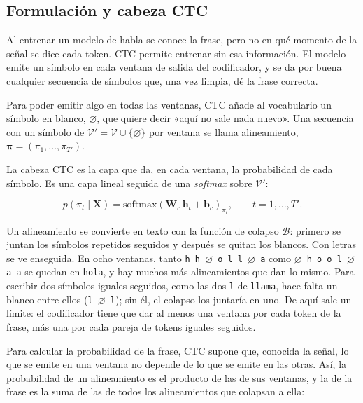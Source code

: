 \subsection{Formulación y cabeza CTC}

Al entrenar un modelo de habla se conoce la frase, pero no en qué momento de la señal se dice cada token. CTC \cite{graves2006ctc} permite entrenar sin esa información. El modelo emite un símbolo en cada ventana de salida del codificador, y se da por buena cualquier secuencia de símbolos que, una vez limpia, dé la frase correcta.

Para poder emitir algo en todas las ventanas, CTC añade al vocabulario un símbolo en blanco, $\varnothing$, que quiere decir «aquí no sale nada nuevo». Una secuencia con un símbolo de $\mathcal{V}' = \mathcal{V} \cup \{\varnothing\}$ por ventana se llama alineamiento, $\boldsymbol{\pi} = (\pi_1, \dots, \pi_{T'})$.

La cabeza CTC es la capa que da, en cada ventana, la probabilidad de cada símbolo. Es una capa lineal seguida de una \textit{softmax} sobre $\mathcal{V}'$:

\begin{equation}
  p(\pi_t \mid \mathbf{X}) = \mathrm{softmax}\left( \mathbf{W}_c\,\mathbf{h}_t + \mathbf{b}_c \right)_{\pi_t}, \qquad t = 1, \dots, T'.
  \label{eq:cabeza-ctc}
\end{equation}

Un alineamiento se convierte en texto con la función de colapso $\mathcal{B}$: primero se juntan los símbolos repetidos seguidos y después se quitan los blancos. Con letras se ve enseguida. En ocho ventanas, tanto \texttt{h h $\varnothing$ o l l $\varnothing$ a} como \texttt{$\varnothing$ h o o l $\varnothing$ a a} se quedan en \texttt{hola}, y hay muchos más alineamientos que dan lo mismo. Para escribir dos símbolos iguales seguidos, como las dos \texttt{l} de \texttt{llama}, hace falta un blanco entre ellos (\texttt{l $\varnothing$ l}); sin él, el colapso los juntaría en uno. De aquí sale un límite: el codificador tiene que dar al menos una ventana por cada token de la frase, más una por cada pareja de tokens iguales seguidos.

Para calcular la probabilidad de la frase, CTC supone que, conocida la señal, lo que se emite en una ventana no depende de lo que se emite en las otras. Así, la probabilidad de un alineamiento es el producto de las de sus ventanas, y la de la frase es la suma de las de todos los alineamientos que colapsan a ella:

